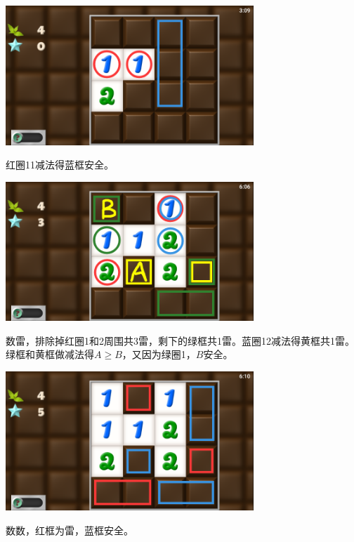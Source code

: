 \subsection{} %
\begin{center}
    \includegraphics[width=0.7\textwidth]{puzzle/39-1.png}
\end{center}
红圈11减法得蓝框安全。
\begin{center}
    \includegraphics[width=0.7\textwidth]{puzzle/39-2.png}
\end{center}
数雷，排除掉红圈1和2周围共3雷，剩下的绿框共1雷。蓝圈12减法得黄框共1雷。绿框和黄框做减法得$A\ge B$，又因为绿圈1，$B$安全。
\begin{center}
    \includegraphics[width=0.7\textwidth]{puzzle/39-3.png}
\end{center}
数数，红框为雷，蓝框安全。

